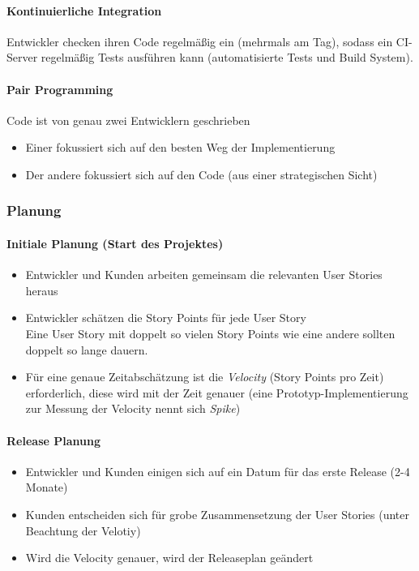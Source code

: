 \documentclass[ngerman,color=3b]{tuda_summary}
\begin{document}
\paragraph{Kontinuierliche Integration}
Entwickler checken ihren Code regelmäßig ein (mehrmals am Tag), sodass ein CI-Server regelmäßig Tests ausführen kann (automatisierte Tests und Build System).

\paragraph{Pair Programming}
Code ist von genau zwei Entwicklern geschrieben
\begin{itemize}
    \item Einer fokussiert sich auf den besten Weg der Implementierung
    \item Der andere fokussiert sich auf den Code (aus einer strategischen Sicht)
\end{itemize}

\subsubsection{Planung}
\paragraph{Initiale Planung (Start des Projektes)}
\begin{itemize}
    \item Entwickler und Kunden arbeiten gemeinsam die relevanten User Stories heraus
    \item Entwickler schätzen die Story Points für jede User Story \\
          {\small Eine User Story mit doppelt so vielen Story Points wie eine andere sollten doppelt so lange dauern.}
    \item Für eine genaue Zeitabschätzung ist die \textit{Velocity} (Story Points pro Zeit) erforderlich, diese wird mit der Zeit genauer (eine Prototyp-Implementierung zur Messung der Velocity nennt sich \textit{Spike})
\end{itemize}

\paragraph{Release Planung}
\begin{itemize}
    \item Entwickler und Kunden einigen sich auf ein Datum für das erste Release (2-4 Monate)
    \item Kunden entscheiden sich für grobe Zusammensetzung der User Stories (unter Beachtung der Velotiy)
    \item Wird die Velocity genauer, wird der Releaseplan geändert
\end{itemize}
\end{document}
